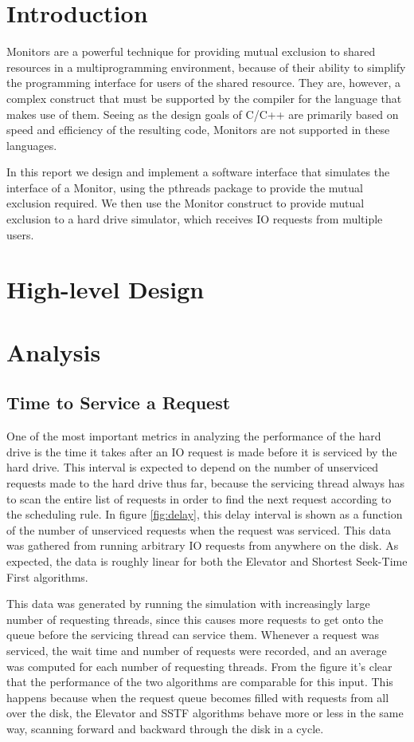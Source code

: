 \documentclass{report}
\begin{document}

\section{Introduction}
Monitors are a powerful technique for providing mutual exclusion to shared
resources in a multiprogramming environment, because of their ability to simplify the
programming interface for users of the shared resource. They are, however, a complex
construct that must be supported by the compiler for the language that makes use of them.
Seeing as the design goals of C/C++ are primarily based on speed and efficiency of the
resulting code, Monitors are not supported in these languages. 

In this report we design and implement a software interface that simulates the interface
of a Monitor, using the pthreads package to provide the mutual exclusion required. We then
use the Monitor construct to provide mutual exclusion to a hard drive simulator, which receives IO requests 
from multiple users.

\section{High-level Design} %

\section{Analysis} %
\subsection{Time to Service a Request}
One of the most important metrics in analyzing the performance of the hard drive is the
time it takes after an IO request is made before it is serviced by the hard drive. This
interval is expected to depend on the number of unserviced requests made to the hard drive
thus far, because the servicing thread always has to scan the entire list of requests in
order to find the next request according to the scheduling rule. In figure
\ref{fig:delay}, this delay interval is shown as a function of the number of unserviced
requests when the request was serviced. This data was gathered from running arbitrary
IO requests from anywhere on the disk. As expected, the data is roughly linear for both
the Elevator and Shortest Seek-Time First algorithms.

This data was generated by running the simulation with increasingly large number of
requesting threads, since this causes more requests to get onto the queue before the
servicing thread can service them. Whenever a request was serviced, the wait time and
number of requests were recorded, and an average was computed for each number of
requesting threads. From the figure it's clear that the performance of the two algorithms
are comparable for this input. This happens because when the request queue becomes filled
with requests from all over the disk, the Elevator and SSTF algorithms behave more or less
in the same way, scanning forward and backward through the disk in a cycle.
\end{document}

